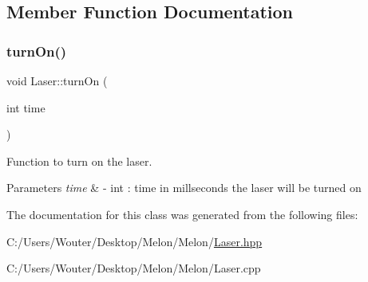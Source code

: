 \subsection{Member Function Documentation}
\mbox{\label{class_laser_a8203b49ef026606ec58976d23c5b5bb9}} 
\subsubsection{\texorpdfstring{turn\+On()}{turnOn()}}
{\footnotesize\ttfamily void Laser\+::turn\+On (\begin{DoxyParamCaption}\item[{int}]{time }\end{DoxyParamCaption})}



Function to turn on the laser. 


\begin{DoxyParams}{Parameters}
{\em time} & -\/ int \+: time in millseconds the laser will be turned on \\
\hline
\end{DoxyParams}


The documentation for this class was generated from the following files\+:\begin{DoxyCompactItemize}
\item 
C\+:/\+Users/\+Wouter/\+Desktop/\+Melon/\+Melon/\hyperlink{_laser_8hpp}{Laser.\+hpp}\item 
C\+:/\+Users/\+Wouter/\+Desktop/\+Melon/\+Melon/Laser.\+cpp\end{DoxyCompactItemize}
